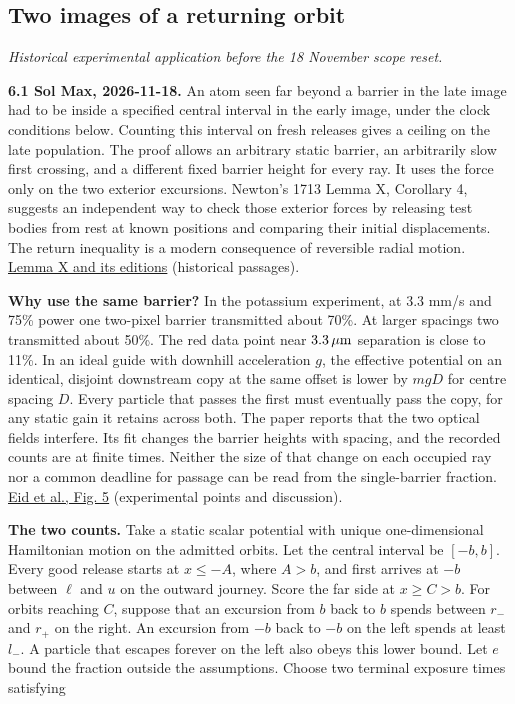 \documentclass[11pt,a4paper]{article}
\begin{document}
\subsection{Two images of a returning
orbit}\label{two-images-of-a-returning-orbit}

\emph{Historical experimental application before the 18 November scope
reset.}

\textbf{6.1 Sol Max, 2026-11-18.} An atom seen far beyond a barrier in
the late image had to be inside a specified central interval in the
early image, under the clock conditions below. Counting this interval on
fresh releases gives a ceiling on the late population. The proof allows
an arbitrary static barrier, an arbitrarily slow first crossing, and a
different fixed barrier height for every ray. It uses the force only on
the two exterior excursions. Newton's 1713 Lemma X, Corollary 4,
suggests an independent way to check those exterior forces by releasing
test bodies from rest at known positions and comparing their initial
displacements. The return inequality is a modern consequence of
reversible radial motion.
\href{newton-insertion-action.md\#lemma-x-and-the-measurement-of-initial-force}{Lemma
X and its editions} (historical passages).

\textbf{Why use the same barrier?} In the potassium experiment, at
\(3.3\) mm/s and 75\% power one two-pixel barrier transmitted about
70\%. At larger spacings two transmitted about 50\%. The red data point
near \(3.3\,\mu{\rm m}\) separation is close to 11\%. In an ideal guide
with downhill acceleration \(g\), the effective potential on an
identical, disjoint downstream copy at the same offset is lower by
\(mgD\) for centre spacing \(D\). Every particle that passes the first
must eventually pass the copy, for any static gain it retains across
both. The paper reports that the two optical fields interfere. Its fit
changes the barrier heights with spacing, and the recorded counts are at
finite times. Neither the size of that change on each occupied ray nor a
common deadline for passage can be read from the single-barrier
fraction. \href{https://arxiv.org/html/2405.14466v1\#S0.F5}{Eid et al.,
Fig. 5} (experimental points and discussion).

\textbf{The two counts.} Take a static scalar potential with unique
one-dimensional Hamiltonian motion on the admitted orbits. Let the
central interval be \([-b,b]\). Every good release starts at
\(x\le -A\), where \(A>b\), and first arrives at \(-b\) between \(\ell\)
and \(u\) on the outward journey. Score the far side at \(x\ge C>b\).
For orbits reaching \(C\), suppose that an excursion from \(b\) back to
\(b\) spends between \(r_-\) and \(r_+\) on the right. An excursion from
\(-b\) back to \(-b\) on the left spends at least \(l_-\). A particle
that escapes forever on the left also obeys this lower bound. Let \(e\)
bound the fraction outside the assumptions. Choose two terminal exposure
times satisfying
\end{document}
